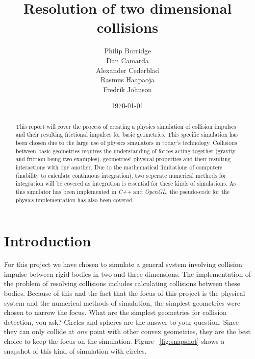 \documentclass[a4paper,12pt]{report}
\title{Resolution of two dimensional collisions}
\author{Philip Burridge\\
        Dan Camarda\\
        Alexander Cederblad\\
        Rasmus Haapaoja\\
        Fredrik Johnson}
\date{\today}
\begin{document}
\maketitle


\begin{abstract}
This report will cover the process of creating a physics simulation of collision impulses and their resulting frictional impulses for basic geometries. This specific simulation has been chosen due to the large use of physics simulators in today's technology. Collisions between basic geometries requires the understanding of forces acting together (gravity and friction being two examples), geometries' physical properties and their resulting interactions with one another. Due to the mathematical limitations of computers (inability to calculate continuous integration), two seperate numerical methods for integration will be covered as integration is essential for these kinds of simulations. As this simulator has been implemented in \emph{C++} and \emph{OpenGL}, the pseudo-code for the physics implementation has also been covered.
\end{abstract}


\tableofcontents
{}


\chapter{Introduction}
\setcounter{page}{1}

For this project we have chosen to simulate a general system involving collision impulse between rigid bodies in two and three dimensions. The implementation of the problem of resolving collisions includes calculating collisions between these bodies. Because of this and the fact that the focus of this project is the physical system and the numerical methods of simulation, the simplest geometries were chosen to narrow the focus. What are the simplest geometries for collision detection, you ask? Circles and spheres are the answer to your question. Since they can only collide at \emph{one} point with other convex geometries, they are the best choice to keep the focus on the simulation. Figure ~\ref{fig:snapshot} shows a snapshot of this kind of simulation with circles.
\end{document}
